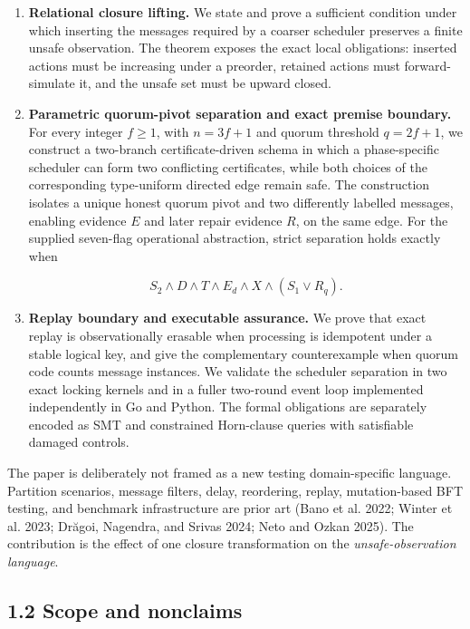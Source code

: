 \documentclass[10pt,a4paper]{article}
\begin{document}
\begin{enumerate}
\def\labelenumi{\arabic{enumi}.}
\item
  \textbf{Relational closure lifting.} We state and prove a sufficient
  condition under which inserting the messages required by a coarser
  scheduler preserves a finite unsafe observation. The theorem exposes
  the exact local obligations: inserted actions must be increasing under
  a preorder, retained actions must forward-simulate it, and the unsafe
  set must be upward closed.
\item
  \textbf{Parametric quorum-pivot separation and exact premise
  boundary.} For every integer \(f\geq1\), with \(n=3f+1\) and quorum
  threshold \(q=2f+1\), we construct a two-branch certificate-driven
  schema in which a phase-specific scheduler can form two conflicting
  certificates, while both choices of the corresponding type-uniform
  directed edge remain safe. The construction isolates a unique honest
  quorum pivot and two differently labelled messages, enabling evidence
  \(E\) and later repair evidence \(R\), on the same edge. For the
  supplied seven-flag operational abstraction, strict separation holds
  exactly when

  \[S_2\land D\land T\land E_d\land X\land(S_1\lor R_q).\]
\item
  \textbf{Replay boundary and executable assurance.} We prove that exact
  replay is observationally erasable when processing is idempotent under
  a stable logical key, and give the complementary counterexample when
  quorum code counts message instances. We validate the scheduler
  separation in two exact locking kernels and in a fuller two-round
  event loop implemented independently in Go and Python. The formal
  obligations are separately encoded as SMT and constrained Horn-clause
  queries with satisfiable damaged controls.
\end{enumerate}

The paper is deliberately not framed as a new testing domain-specific
language. Partition scenarios, message filters, delay, reordering,
replay, mutation-based BFT testing, and benchmark infrastructure are
prior art (Bano et al. 2022; Winter et al. 2023; Drăgoi, Nagendra, and
Srivas 2024; Neto and Ozkan 2025). The contribution is the effect of one
closure transformation on the \emph{unsafe-observation language}.

\subsection{1.2 Scope and nonclaims}\label{scope-and-nonclaims}
\end{document}
